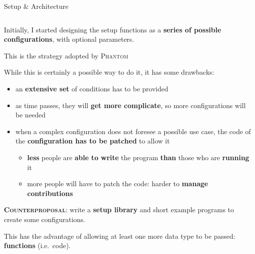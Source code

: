 \documentclass[9pt]{beamer}
\renewcommand{\phantom}{\textsc{Phantom}\xspace}
\begin{document}
\begin{frame}{Setup \& Architecture}
    \begin{columns}
        \begin{column}{0.5\textwidth}
            \vspace*{15pt}

            Initially, I started designing the setup functions as a
            \textbf{series of possible configurations}, with optional
            parameters.

            This is the strategy adopted by \phantom
            \vspace*{10pt}

            While this is certainly a possible way to do it, it has some
            drawbacks:
            \begin{itemize}
                \item an \textbf{extensive set} of conditions has to be provided
                \item as time passes, they will \textbf{get more complicate},
                    so more configurations will be needed
                \item when a complex configuration does not foresee a possible
                  use case, the code of the \textbf{configuration has to be
                  patched} to allow it
                  \begin{itemize}
                      \item \textbf{less} people are \textbf{able to write} the
                        program \textbf{than} those who are \textbf{running} it
                      \item more people will have to patch the code: harder to
                        \textbf{manage contributions}
                  \end{itemize}
            \end{itemize}
            \vspace*{10pt}

            \textbf{\textsc{\color{ForestGreen} Counterproposal}}: write a
            \alert{\textbf{setup library}} and short example programs to create
            some configurations.

            This has the advantage of allowing at least one more data type to
            be passed: \alert{\textbf{functions}} (i.e.\ code).
            

\end{column}
\end{columns}
\end{frame}
\end{document}

